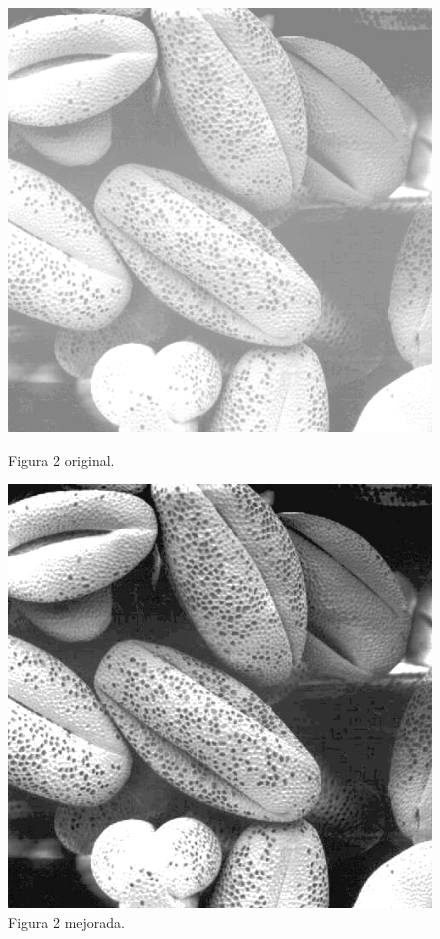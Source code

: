\documentclass[11pt, letterpaper]{article}
\begin{document}
\begin{figure}[h]
	\centering
	\begin{minipage}{0.45\textwidth}
		\centering
		\includegraphics[width=\textwidth]{IMG/Fig3.15(a)2.jpg}
		\caption{Figura 2 original.}
		\label{fig:f11}
	\end{minipage}\hfill
	\begin{minipage}{0.45\textwidth}
		\centering
		\includegraphics[width=\textwidth]{RESULTADOS/img25.png}
		\caption{Figura 2 mejorada.}
		\label{fig:f12}
	\end{minipage}
	

\end{figure}
\end{document}
